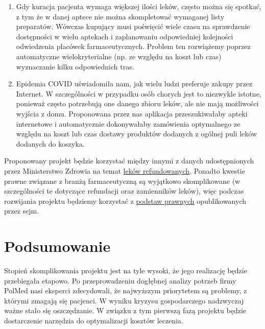 \documentclass[12pt, a4paper]{article}
\begin{document}
\begin{enumerate}
    \item Gdy kuracja pacjenta wymaga większej ilości leków, często można
      się spotkać, z tym że w danej aptece nie można skompletować wymaganej
      listy preparatów. Wówczas kupujący musi poświęcić wiele czasu na
      sprawdzenie dostępności w wielu aptekach i zaplanowaniu odpowiedniej
      kolejności odwiedzenia placówek farmaceutycznych. Problem ten rozwiążemy
      poprzez automatyczne wielokryterialne (np. ze względu na koszt lub czas)
      wyznaczanie kilku odpowiednich tras.
    \item Epidemia COVID uświadomiła nam, jak wielu ludzi preferuje zakupy przez
      Internet. W szczególności w przypadku osób chorych jest to niezwykle
      istotne, ponieważ często potrzebują one danego zbioru leków, ale nie mają
      możliwości wyjścia z domu. Proponowana przez nas aplikacja
      przeszukiwałaby apteki internetowe i automatycznie dokonywałaby
      zamówienia optymalnego ze względu na koszt lub czas dostawy produktów
      dodanych z ogólnej puli leków dodanych do koszyka.
\end{enumerate}

Proponowany projekt będzie korzystać między innymi z danych udostępnionych
przez Ministerstwo Zdrowia na temat
\href{https://www.gov.pl/web/zdrowie/obwieszczenia-ministra-zdrowia-lista-lekow-refundowanych?fbclid=IwAR3kUJzPeXQa_i6aKzo8EIS-HuLgArTdgc19OfAbQsrTF7Xd2xNiUIUym7c}{leków
refundowanych}. Ponadto kwestie prawne związane z branżą farmaceutyczną są
wyjątkowo skomplikowane (w szczególności te dotyczące refundacji oraz
zamienników leków), więc podczas rozwijania projektu będziemy korzystać
z \href{https://isap.sejm.gov.pl/isap.nsf/download.xsp/WDU20111220696/U/D20110696Lj.pdf}{podstaw
prawnych} opublikowanych przez sejm. 

\section{Podsumowanie}
Stopień skomplikowania projektu jest na tyle wysoki, że jego realizację będzie
przebiegała etapowo. Po przeprowadzeniu dogłębnej analizy potrzeb firmy PolMed
nasi eksperci zdecydowali, że najwyższym priorytetem są problemy, z którymi
zmagają się pacjenci. W wyniku kryzysu gospodarczego nadzwyczaj ważne stało się
oszczędzanie. W związku z tym pierwszą fazą projektu będzie dostarczenie
narzędzia do optymalizacji kosztów leczenia.
\end{document}
